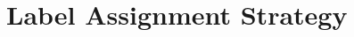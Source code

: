 \documentclass[12pt,a4paper]{report}
\newcommand{\todo}[1]{%
  \par\noindent%
  \begin{tcolorbox}[colback=yellow, colframe=black, boxrule=0.5pt, sharp corners, width=\linewidth, before skip=5pt, after skip=5pt]
    \textbf{TODO:} #1
  \end{tcolorbox}%
  \par
}
\newcommand{\remark}[1]{%
  \par\noindent%
  \begin{tcolorbox}[ colback=orange!20!white, colframe=orange!80!black, boxrule=0.5pt, sharp corners, width=\linewidth, ]
    {\textbf{\textcolor{orange!80!black}!REMARK:}}~#1
  \end{tcolorbox}%
}
\begin{document}
\section{Label Assignment Strategy}
\end{document}
